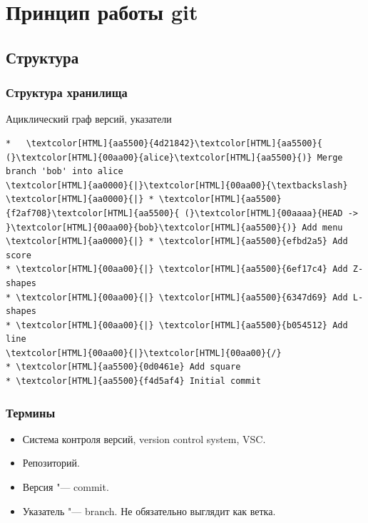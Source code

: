 \documentclass[pdf,russian]{beamer}
\begin{document}
\section{Принцип работы git}

\subsection{Структура}

\begin{frame}[fragile]
    \frametitle{Структура хранилища}

    Ациклический граф версий, указатели
    \begin{block}{}
        \begin{Verbatim}[commandchars=\\\{\}]
*   \textcolor[HTML]{aa5500}{4d21842}\textcolor[HTML]{aa5500}{ (}\textcolor[HTML]{00aa00}{alice}\textcolor[HTML]{aa5500}{)} Merge branch 'bob' into alice
\textcolor[HTML]{aa0000}{|}\textcolor[HTML]{00aa00}{\textbackslash}
\textcolor[HTML]{aa0000}{|} * \textcolor[HTML]{aa5500}{f2af708}\textcolor[HTML]{aa5500}{ (}\textcolor[HTML]{00aaaa}{HEAD -> }\textcolor[HTML]{00aa00}{bob}\textcolor[HTML]{aa5500}{)} Add menu
\textcolor[HTML]{aa0000}{|} * \textcolor[HTML]{aa5500}{efbd2a5} Add score
* \textcolor[HTML]{00aa00}{|} \textcolor[HTML]{aa5500}{6ef17c4} Add Z-shapes
* \textcolor[HTML]{00aa00}{|} \textcolor[HTML]{aa5500}{6347d69} Add L-shapes
* \textcolor[HTML]{00aa00}{|} \textcolor[HTML]{aa5500}{b054512} Add line
\textcolor[HTML]{00aa00}{|}\textcolor[HTML]{00aa00}{/}
* \textcolor[HTML]{aa5500}{0d0461e} Add square
* \textcolor[HTML]{aa5500}{f4d5af4} Initial commit
        \end{Verbatim}
    \end{block}
\end{frame}

\begin{frame}
    \frametitle{Термины}
    \begin{itemize}
        \pause
        \item Система контроля версий, version control system, VSC.
        \pause
        \item Репозиторий.
        \pause
        \item Версия "--- commit.
        \pause
        \item Указатель "--- branch. \pause Не обязательно выглядит как ветка.
    \end{itemize}
\end{frame}
\end{document}
